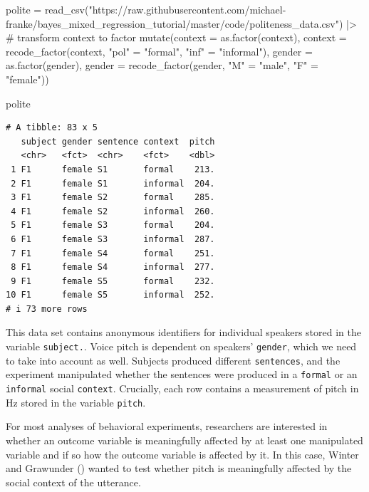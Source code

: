 \documentclass[
  doc,
  floatsintext,
  longtable,
  nolmodern,
  notxfonts,
  notimes,
  colorlinks=true,linkcolor=blue,citecolor=blue,urlcolor=blue]{apa7}
\newenvironment{Shaded}{\begin{snugshade}}{\end{snugshade}}
\newcommand{\AttributeTok}[1]{\textcolor[rgb]{0.40,0.45,0.13}{#1}}
\newcommand{\CommentTok}[1]{\textcolor[rgb]{0.37,0.37,0.37}{#1}}
\newcommand{\FunctionTok}[1]{\textcolor[rgb]{0.28,0.35,0.67}{#1}}
\newcommand{\NormalTok}[1]{\textcolor[rgb]{0.00,0.23,0.31}{#1}}
\newcommand{\OtherTok}[1]{\textcolor[rgb]{0.00,0.23,0.31}{#1}}
\newcommand{\SpecialCharTok}[1]{\textcolor[rgb]{0.37,0.37,0.37}{#1}}
\newcommand{\StringTok}[1]{\textcolor[rgb]{0.13,0.47,0.30}{#1}}
\begin{document}
\begin{Shaded}
\begin{Highlighting}[]
\NormalTok{polite }\OtherTok{=} \FunctionTok{read\_csv}\NormalTok{(}\StringTok{"https://raw.githubusercontent.com/michael{-}franke/bayes\_mixed\_regression\_tutorial/master/code/politeness\_data.csv"}\NormalTok{) }\SpecialCharTok{|\textgreater{}} 
  \CommentTok{\# transform context to factor}
  \FunctionTok{mutate}\NormalTok{(}\AttributeTok{context =} \FunctionTok{as.factor}\NormalTok{(context),}
         \AttributeTok{context =} \FunctionTok{recode\_factor}\NormalTok{(context,}
                                 \StringTok{"pol"} \OtherTok{=} \StringTok{"formal"}\NormalTok{,}
                                 \StringTok{"inf"} \OtherTok{=} \StringTok{"informal"}\NormalTok{),}
         \AttributeTok{gender =} \FunctionTok{as.factor}\NormalTok{(gender),}
         \AttributeTok{gender =} \FunctionTok{recode\_factor}\NormalTok{(gender,}
                                \StringTok{"M"} \OtherTok{=} \StringTok{"male"}\NormalTok{,}
                                \StringTok{"F"} \OtherTok{=} \StringTok{"female"}\NormalTok{))}

\NormalTok{polite}
\end{Highlighting}
\end{Shaded}

\begin{verbatim}
# A tibble: 83 x 5
   subject gender sentence context  pitch
   <chr>   <fct>  <chr>    <fct>    <dbl>
 1 F1      female S1       formal    213.
 2 F1      female S1       informal  204.
 3 F1      female S2       formal    285.
 4 F1      female S2       informal  260.
 5 F1      female S3       formal    204.
 6 F1      female S3       informal  287.
 7 F1      female S4       formal    251.
 8 F1      female S4       informal  277.
 9 F1      female S5       formal    232.
10 F1      female S5       informal  252.
# i 73 more rows
\end{verbatim}

This data set contains anonymous identifiers for individual speakers
stored in the variable \texttt{subject.}. Voice pitch is dependent on
speakers' \texttt{gender}, which we need to take into account as well.
Subjects produced diﬀerent \texttt{sentences}, and the experiment
manipulated whether the sentences were produced in a \texttt{formal} or
an \texttt{informal} social \texttt{context}. Crucially, each row
contains a measurement of pitch in Hz stored in the variable
\texttt{pitch}.

For most analyses of behavioral experiments, researchers are interested
in whether an outcome variable is meaningfully affected by at least one
manipulated variable and if so how the outcome variable is affected by
it. In this case, Winter and Grawunder
()
wanted to test whether pitch is meaningfully affected by the social
context of the utterance.
\end{document}
